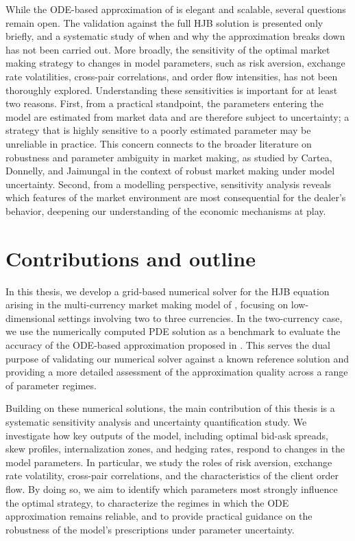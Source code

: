 While the ODE-based approximation of \cite{barzykin2023} is elegant and scalable, several questions remain open. The validation against the full HJB solution is presented only briefly, and a systematic study of when and why the approximation breaks down has not been carried out. More broadly, the sensitivity of the optimal market making strategy to changes in model parameters, such as risk aversion, exchange rate volatilities, cross-pair correlations, and order flow intensities, has not been thoroughly explored. Understanding these sensitivities is important for at least two reasons. First, from a practical standpoint, the parameters entering the model are estimated from market data and are therefore subject to uncertainty; a strategy that is highly sensitive to a poorly estimated parameter may be unreliable in practice. This concern connects to the broader literature on robustness and parameter ambiguity in market making, as studied by Cartea, Donnelly, and Jaimungal \cite{cartea2017} in the context of robust market making under model uncertainty. Second, from a modelling perspective, sensitivity analysis reveals which features of the market environment are most consequential for the dealer's behavior, deepening our understanding of the economic mechanisms at play.

\section*{Contributions and outline}

In this thesis, we develop a grid-based numerical solver for the HJB equation arising in the multi-currency market making model of \cite{barzykin2023}, focusing on low-dimensional settings involving two to three currencies. In the two-currency case, we use the numerically computed PDE solution as a benchmark to evaluate the accuracy of the ODE-based approximation proposed in \cite{barzykin2023}. This serves the dual purpose of validating our numerical solver against a known reference solution and providing a more detailed assessment of the approximation quality across a range of parameter regimes.

Building on these numerical solutions, the main contribution of this thesis is a systematic sensitivity analysis and uncertainty quantification study. We investigate how key outputs of the model, including optimal bid-ask spreads, skew profiles, internalization zones, and hedging rates, respond to changes in the model parameters. In particular, we study the roles of risk aversion, exchange rate volatility, cross-pair correlations, and the characteristics of the client order flow. By doing so, we aim to identify which parameters most strongly influence the optimal strategy, to characterize the regimes in which the ODE approximation remains reliable, and to provide practical guidance on the robustness of the model's prescriptions under parameter uncertainty.

